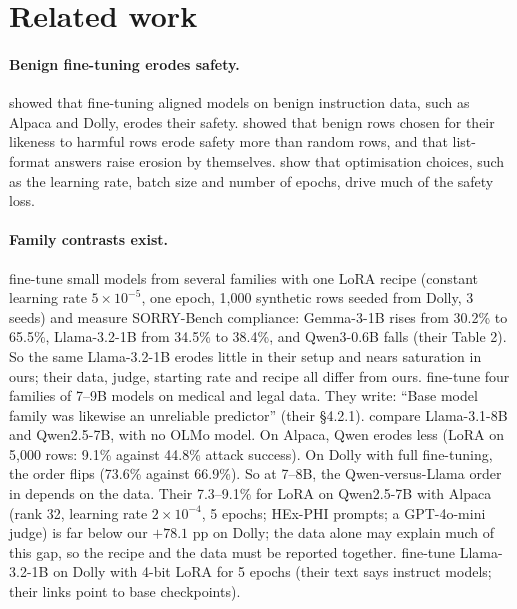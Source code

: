 \documentclass{article}
\begin{document}
\section{Related work}
\label{sec:related}

\paragraph{Benign fine-tuning erodes safety.} \citet{qi2024finetuning} showed
that fine-tuning aligned models on benign instruction data, such as Alpaca and
Dolly, erodes their safety. \citet{he2024safe} showed that benign rows chosen
for their likeness to harmful rows erode safety more than random rows, and that
list-format answers raise erosion by themselves.
\citet{kim2025rethinking} show that optimisation choices, such as the learning
rate, batch size and number of epochs, drive much of the safety loss.

\paragraph{Family contrasts exist.}
\citet{hawkins2026heterogeneoussafetyimpactsbenign} fine-tune small models from
several families with one LoRA recipe (constant learning rate
$5 \times 10^{-5}$, one epoch, 1,000 synthetic rows seeded from Dolly, 3
seeds) and measure SORRY-Bench compliance: Gemma-3-1B rises from 30.2\% to
65.5\%, Llama-3.2-1B from 34.5\% to 38.4\%, and Qwen3-0.6B falls (their Table
2). So the same Llama-3.2-1B erodes little in their setup and nears saturation
in ours; their data, judge, starting rate and recipe all differ from ours. \citet{khan2026safetydriftfinetuningevidence} fine-tune four families of
7--9B models on medical and legal data. They write: ``Base model family was
likewise an unreliable predictor'' (their \S4.2.1). \citet{guo2026safety}
compare Llama-3.1-8B and Qwen2.5-7B, with no OLMo model. On Alpaca, Qwen erodes
less (LoRA on 5,000 rows: 9.1\% against 44.8\% attack success). On Dolly with
full fine-tuning, the order flips (73.6\% against 66.9\%). So at 7--8B, the
Qwen-versus-Llama order in \citet{guo2026safety} depends on the data.
Their 7.3--9.1\% for LoRA on Qwen2.5-7B with Alpaca (rank 32, learning rate
$2 \times 10^{-4}$, 5 epochs; HEx-PHI prompts; a GPT-4o-mini judge) is far
below our $+78.1$ pp on Dolly; the data alone may explain much of this gap, so
the recipe and the data must be reported together.
\citet{fraser2025finetuninglowerssafetydisrupts} fine-tune Llama-3.2-1B on
Dolly with 4-bit LoRA for 5 epochs (their text says instruct models; their
links point to base checkpoints).
\end{document}
